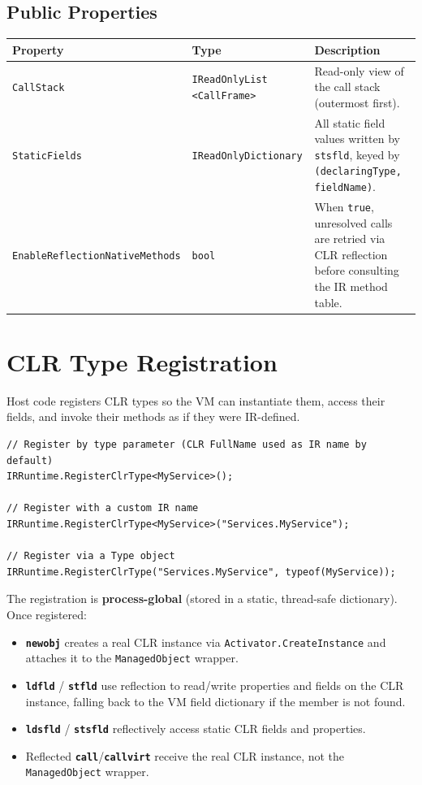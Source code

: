 \documentclass[11pt,a4paper]{article}
\newcommand{\code}[1]{\texttt{\small #1}}
\newcommand{\typename}[1]{\textcolor{typecolor}{\texttt{\small #1}}}
\newcommand{\opcode}[1]{\textbf{\texttt{#1}}}
\begin{document}
\subsection{Public Properties}

\begin{longtable}{p{5.5cm}p{2.2cm}p{6cm}}
  \toprule
  \textbf{Property} & \textbf{Type} & \textbf{Description} \\
  \midrule
  \endhead
  \code{CallStack}                      & \code{IReadOnlyList} \code{<CallFrame>} &
    Read-only view of the call stack (outermost first). \\[0.4em]
  \code{StaticFields}                   & \code{IReadOnlyDictionary} &
    All static field values written by \code{stsfld}, keyed by
    \code{(declaringType, fieldName)}. \\[0.4em]
  \code{EnableReflectionNativeMethods}  & \code{bool} &
    When \code{true}, unresolved calls are retried via CLR reflection before
    consulting the IR method table. \\
  \bottomrule
\end{longtable}

\section{CLR Type Registration}
\label{sec:clrreg}

Host code registers CLR types so the VM can instantiate them, access their
fields, and invoke their methods as if they were IR-defined.

\begin{lstlisting}[style=cs]
// Register by type parameter (CLR FullName used as IR name by default)
IRRuntime.RegisterClrType<MyService>();

// Register with a custom IR name
IRRuntime.RegisterClrType<MyService>("Services.MyService");

// Register via a Type object
IRRuntime.RegisterClrType("Services.MyService", typeof(MyService));
\end{lstlisting}

The registration is \textbf{process-global} (stored in a static, thread-safe
dictionary). Once registered:

\begin{itemize}[leftmargin=1.8em]
  \item \opcode{newobj} creates a real CLR instance via
    \code{Activator.CreateInstance} and attaches it to the
    \typename{ManagedObject} wrapper.
  \item \opcode{ldfld} / \opcode{stfld} use reflection to read/write
    properties and fields on the CLR instance, falling back to the VM field
    dictionary if the member is not found.
  \item \opcode{ldsfld} / \opcode{stsfld} reflectively access static CLR
    fields and properties.
  \item Reflected \opcode{call}/\opcode{callvirt} receive the real CLR
    instance, not the \typename{ManagedObject} wrapper.
\end{itemize}
\end{document}
